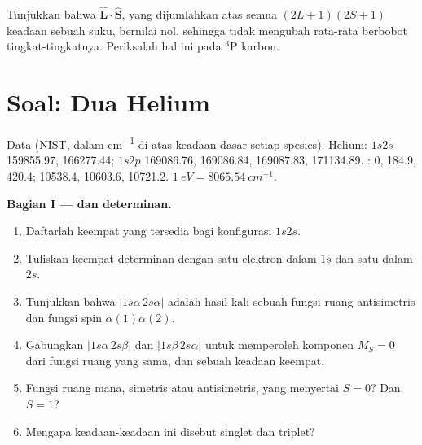 \begin{exercise}[$\star\star\star$]\label{exo:b3:many-electron-atoms:12}
Tunjukkan bahwa  $\hat{\mathbf L}\cdot\hat{\mathbf S}$, yang
dijumlahkan atas semua $(2L+1)(2S+1)$ keadaan sebuah suku, bernilai nol,
sehingga  tidak mengubah rata-rata berbobot
tingkat-tingkatnya. Periksalah hal ini pada ${}^3$P karbon.
\end{exercise}

\section{Soal: Dua Helium}

\begin{problem}
\label{pb:b3:many-electron-atoms:1}
Data (NIST, dalam \unit{cm^{-1}} di atas keadaan dasar setiap spesies). Helium:
$1s2s$  159855.97,  166277.44; $1s2p$
 169086.76, 169086.84, 169087.83, 
171134.89. :  0, 184.9, 420.4; 
10538.4, 10603.6, 10721.2. $\qty{1}{eV} = \qty{8065.54}{cm^{-1}}$.

\medskip\noindent\textbf{Bagian I ---  dan determinan.}
\begin{enumerate}[beginpenalty=10000]
  \item Daftarlah keempat  yang tersedia bagi konfigurasi $1s2s$.
  \item Tuliskan keempat determinan dengan satu elektron dalam $1s$ dan satu
        dalam $2s$.
  \item Tunjukkan bahwa $|1s\alpha\,2s\alpha|$ adalah hasil kali sebuah fungsi
        ruang antisimetris dan fungsi spin $\alpha(1)\alpha(2)$.
  \item Gabungkan $|1s\alpha\,2s\beta|$ dan $|1s\beta\,2s\alpha|$ untuk
        memperoleh komponen $M_S = 0$ dari fungsi ruang yang sama, dan sebuah
        keadaan keempat.
  \item Fungsi ruang mana, simetris atau antisimetris, yang menyertai
        $S = 0$? Dan $S = 1$?
  \item Mengapa keadaan-keadaan ini disebut singlet dan triplet?
\end{enumerate}


\end{problem}
